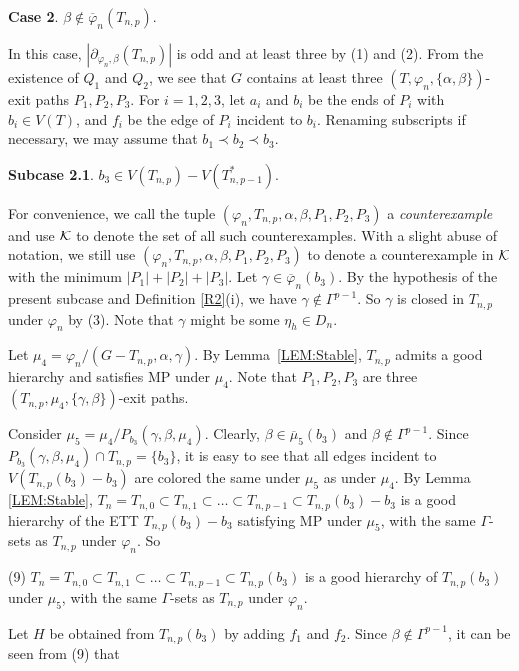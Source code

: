 \documentclass[11pt]{article}
\newcommand{\phibar}{\overline{\varphi}}
\begin{document}
\vskip 2mm
{\bf Case 2}. $\beta\notin \overline{\varphi}_n(T_{n,p})$.

In this case, $|\partial_{\varphi_n, \beta}(T_{n,p})|$ is odd and at least three by (1) and (2). From the existence of 
$Q_1$ and $Q_2$, we see that $G$ contains at least three $(T, \varphi_n, \{\alpha, \beta\})$-exit paths $P_1,P_2,P_3$. 
For $i=1,2,3$, let $a_i$ and $b_i$ be the ends of $P_i$ with $b_i \in V(T)$, and 
$f_i$ be the edge of $P_i$ incident to $b_i$.  Renaming subscripts if necessary, we may assume that $b_1\prec b_2 \prec b_3$. 

{\bf Subcase 2.1}. $b_3\in V(T_{n,p})-V(T_{n,p-1}^*)$.	

For convenience, we call the tuple $(\varphi_n, T_{n,p}, \alpha, \beta, P_1,P_2,P_3)$ a {\em counterexample} and use ${\cal K}$ 
to denote the set of all such counterexamples. With a slight abuse of notation, we still use $(\varphi_n, T_{n,p}, \alpha, \beta, P_1,
P_2,P_3)$ to denote a counterexample in ${\cal K}$ with the minimum $|P_1|+|P_2|+|P_3|$.  Let $\gamma\in\phibar_n(b_3)$.
By the hypothesis of the present subcase and Definition \ref{R2}(i), we have $\gamma\notin \Gamma^{p-1}$. So $\gamma$ 
is closed in $T_{n,p}$ under $\varphi_n$ by (3). Note that $\gamma$ might be some $\eta_h \in D_n$. 

Let $\mu_4=\varphi_n/(G-T_{n,p}, \alpha,\gamma)$. By Lemma~\ref{LEM:Stable},  $T_{n,p}$ admits a good hierarchy and satisfies MP under $\mu_4$. 
Note that $P_1,P_2, P_3$ are three $(T_{n,p}, \mu_4, \{\gamma, \beta\})$-exit paths.


Consider $\mu_5=\mu_4/P_{b_3}(\gamma, \beta, \mu_4)$. Clearly, $\beta \in \overline{\mu}_5(b_3)$ and $\beta\notin 
\Gamma^{p-1}$. Since $P_{b_3}(\gamma, \beta, \mu_4) \cap T_{n,p}=\{b_3\}$, it is easy to see that all edges incident to 
$V(T_{n,p}(b_3)-b_3)$ are colored the same under $\mu_5$ as under $\mu_4$. By Lemma \ref{LEM:Stable}, $T_n=T_{n,0} \subset T_{n,1}  
\subset \ldots \subset T_{n,p-1} \subset T_{n,p}(b_3)-b_3$ is a good hierarchy of the ETT $T_{n,p}(b_3)-b_3$ satisfying MP under $\mu_5$, with 
the same $\Gamma$-sets as $T_{n,p}$ under $\varphi_n$. So 

(9) $T_n=T_{n,0} \subset T_{n,1}  \subset \ldots \subset T_{n,p-1} \subset T_{n,p}(b_3)$ is a good hierarchy 
of $T_{n,p}(b_3)$ under $\mu_5$, with the same $\Gamma$-sets as $T_{n,p}$ under $\varphi_n$. 

Let $H$ be obtained from $T_{n,p}(b_3)$ by adding $f_1$ and $f_2$. Since $\beta\notin\Gamma^{p-1}$, it can be seen from (9) that
\end{document}

